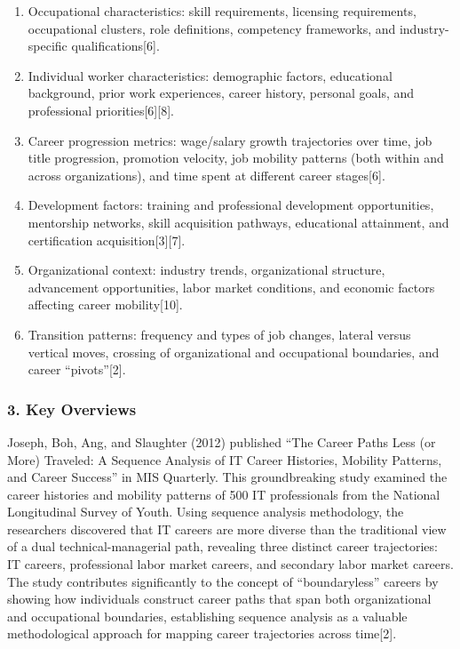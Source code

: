 \documentclass[./main.tex]{subfiles}
\begin{document}
\begin{enumerate}
\def\labelenumi{\arabic{enumi}.}
\item
  Occupational characteristics: skill requirements, licensing
  requirements, occupational clusters, role definitions, competency
  frameworks, and industry-specific qualifications{[}6{]}.
\item
  Individual worker characteristics: demographic factors, educational
  background, prior work experiences, career history, personal goals,
  and professional priorities{[}6{]}{[}8{]}.
\item
  Career progression metrics: wage/salary growth trajectories over time,
  job title progression, promotion velocity, job mobility patterns (both
  within and across organizations), and time spent at different career
  stages{[}6{]}.
\item
  Development factors: training and professional development
  opportunities, mentorship networks, skill acquisition pathways,
  educational attainment, and certification acquisition{[}3{]}{[}7{]}.
\item
  Organizational context: industry trends, organizational structure,
  advancement opportunities, labor market conditions, and economic
  factors affecting career mobility{[}10{]}.
\item
  Transition patterns: frequency and types of job changes, lateral
  versus vertical moves, crossing of organizational and occupational
  boundaries, and career ``pivots''{[}2{]}.
\end{enumerate}

\subsubsection{3. Key Overviews}\label{key-overviews}

Joseph, Boh, Ang, and Slaughter (2012) published ``The Career Paths Less
(or More) Traveled: A Sequence Analysis of IT Career Histories, Mobility
Patterns, and Career Success'' in MIS Quarterly. This groundbreaking
study examined the career histories and mobility patterns of 500 IT
professionals from the National Longitudinal Survey of Youth. Using
sequence analysis methodology, the researchers discovered that IT
careers are more diverse than the traditional view of a dual
technical-managerial path, revealing three distinct career trajectories:
IT careers, professional labor market careers, and secondary labor
market careers. The study contributes significantly to the concept of
``boundaryless'' careers by showing how individuals construct career
paths that span both organizational and occupational boundaries,
establishing sequence analysis as a valuable methodological approach for
mapping career trajectories across time{[}2{]}.
\end{document}
